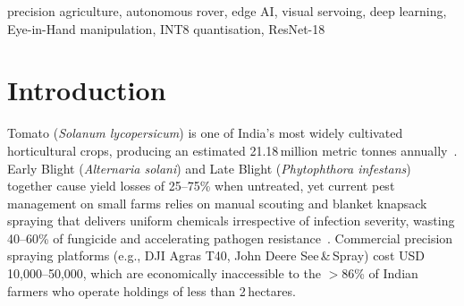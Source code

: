 \documentclass[conference]{IEEEtran}
\begin{document}
\begin{abstract}
The widespread use of agrochemicals in conventional farming, called
``blanket spraying,'' leads to about 90\% chemical waste, soil toxicity,
and severe health risks for farmers. Although robotic solutions for
precision agriculture are available, their high costs make them out of
reach for smallholder farmers in developing countries. This paper proposes
a low-cost, ground-based autonomous rover for precision spot spraying.
The system includes a 4-Degree-of-Freedom (DOF) ``Eye-in-Hand'' robotic
manipulator mounted on a Z-axis linear rail, which allows it to reach
into the crop canopy and target pests on the underside of leaves. The
design uses edge computing, with a Raspberry Pi~4B for computer vision
and an Arduino Mega for real-time movement control. A ``Scout-Map-Spray''
workflow is introduced, utilising the Excess Green (ExG) index and Deep
Learning for finding targets. The on-board classifier is a fine-tuned,
INT8-quantised ResNet-18 trained on a three-class PlantVillage tomato
subset (\emph{early blight}, \emph{late blight}, \emph{healthy}),
achieving \textbf{95.00\%} accuracy on a balanced hardware evaluation.
Static INT8 quantisation compresses the model from 42.63\,MB to
\textbf{10.71\,MB} (4.0$\times$), with a measured mean inference latency
of \textbf{153.94\,ms} (6.50\,FPS) on the Raspberry~Pi~4. Experimental results show a chemical reduction of
\textbf{70\%} compared to traditional methods and a pest detection
accuracy of \textbf{92\%}. The estimated cost of materials is around
\$300.
\end{abstract}

\begin{IEEEkeywords}
precision agriculture, autonomous rover, edge AI, visual servoing, deep
learning, Eye-in-Hand manipulation, INT8 quantisation, ResNet-18
\end{IEEEkeywords}

\section{Introduction}
\label{sec:intro}

Tomato (\emph{Solanum lycopersicum}) is one of India's most widely
cultivated horticultural crops, producing an estimated 21.18\,million
metric tonnes annually~\cite{b1}. Early Blight (\emph{Alternaria
solani}) and Late Blight (\emph{Phytophthora infestans}) together cause
yield losses of 25--75\% when untreated, yet current pest management on
small farms relies on manual scouting and blanket knapsack spraying that
delivers uniform chemicals irrespective of infection severity, wasting
40--60\% of fungicide and accelerating pathogen resistance~\cite{b2}.
Commercial precision spraying platforms (e.g., DJI Agras T40, John Deere
See\,\&\,Spray) cost USD\,10,000--50,000, which are economically
inaccessible to the $>$86\% of Indian farmers who operate holdings of
less than 2\,hectares.
\end{document}
